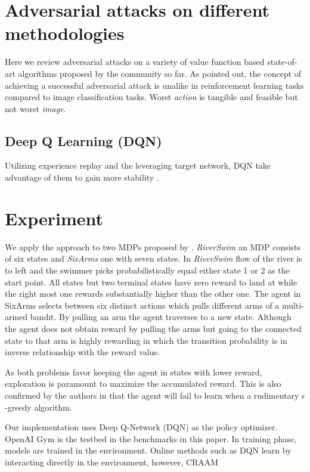 \documentclass{article}
\begin{document}
\section{Adversarial attacks on different methodologies}
Here we review adversarial attacks on a variety of value function based state-of-art algorithms proposed by the community so far. As \cite{Pattanaik2018} pointed out, the concept of achieving a successful adversarial attack is unalike in reinforcement learning tasks compared to image classification tasks. Worst \textit{action} is tangible and feasible but not worst \textit{image}.

\subsection{Deep Q Learning (DQN)}
Utilizing experience replay and the leveraging target network, DQN take advantage of them to gain more stability \cite{Pattanaik2018}.

\section{Experiment}
We apply the approach to two MDPs proposed by \cite{Strehl2004AnProcesses}. \textit{RiverSwim} an MDP consists of six states and \textit{SixArms} one with seven states. In \textit{RiverSwim} flow of the river is to left and the swimmer picks probabilistically equal either state 1 or 2 as the start point. All states but two terminal states have zero reward to land at while the right most one rewards substantially higher than the other one. The agent in SixArms selects between six distinct actions which pulls different arms of a multi-armed bandit. By pulling an arm the agent traverses to a new state. Although the agent does not obtain reward by pulling the arms but going to the connected state to that arm is highly rewarding in which the transition probability is in inverse relationship with the reward value. 

As both problems favor keeping the agent in states with lower reward, exploration is paramount to maximize the accumulated reward. This is also confirmed by the authors in \cite{Strehl2004AnProcesses} that the agent will fail to learn when a rudimentary $\epsilon$-greedy algorithm. 

Our implementation uses Deep Q-Network (DQN) \cite{Mnih2015} as the policy optimizer. OpenAI Gym \cite{BrockmanOpenAIGym} is the testbed in the benchmarks in this paper. In training phase, models are trained in the environment. Online methods such as DQN learn by interacting directly in the environment, however, CRAAM 
\end{document}
